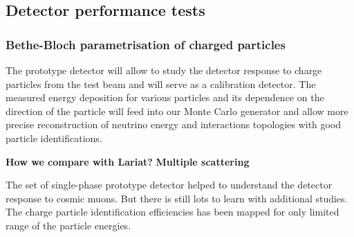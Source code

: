 
\subsection{Detector performance tests}

\subsubsection{Bethe-Bloch parametrisation of charged particles}

The prototype detector will allow to study the detector response to charge particles from the test beam and will serve as a calibration detector. The measured energy deposition for various particles and its dependence on the direction of the particle will feed into our Monte Carlo generator and allow more precise reconstruction of neutrino energy and interactions topologies with good particle identifications.
 
{\bf How we compare with Lariat?} 
{\bf Multiple scattering}  

The set of single-phase prototype detector helped to understand the detector response to cosmic muons. But there is still lots to learn with additional studies. 
The charge  particle identification efficiencies  has been mapped for only limited range of the particle energies.  

